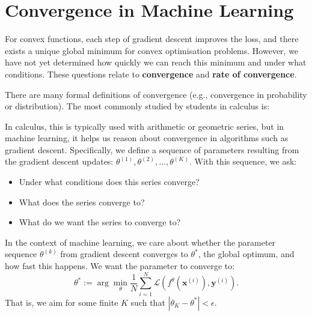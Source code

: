 \section{Convergence in Machine Learning}
For convex functions, each step of gradient descent improves the loss, and there exists a unique global minimum for convex optimisation problems. However, we have not yet determined how quickly we can reach this minimum and under what conditions. These questions relate to \textbf{convergence} and \textbf{rate of convergence}.

There are many formal definitions of convergence (e.g., convergence in probability or distribution). The most commonly studied by students in calculus is:





In calculus, this is typically used with arithmetic or geometric series, but in machine learning, it helps us reason about convergence in algorithms such as gradient descent. Specifically, we define a sequence of parameters resulting from the gradient descent updates: \(\theta^{(1)}, \theta^{(2)}, \dots, \theta^{(K)}\). With this sequence, we ask:

\begin{itemize}
    \item Under what conditions does this series converge?
    \item What does the series converge to?
    \item What do we want the series to converge to?
\end{itemize}

In the context of machine learning, we care about whether the parameter sequence \(\theta^{(k)}\) from gradient descent converges to \(\theta^*\), the global optimum, and how fast this happens. We want the parameter to converge to:
\[
    \theta^* := \arg\min_\theta \frac{1}{N} \sum_{i=1}^{N} \mathcal{L}(f^\theta(\bm{x}^{(i)}), \bm{y}^{(i)}).
\]
That is, we aim for some finite \(K\) such that \(|\theta_K - \theta^*| < \epsilon\).

